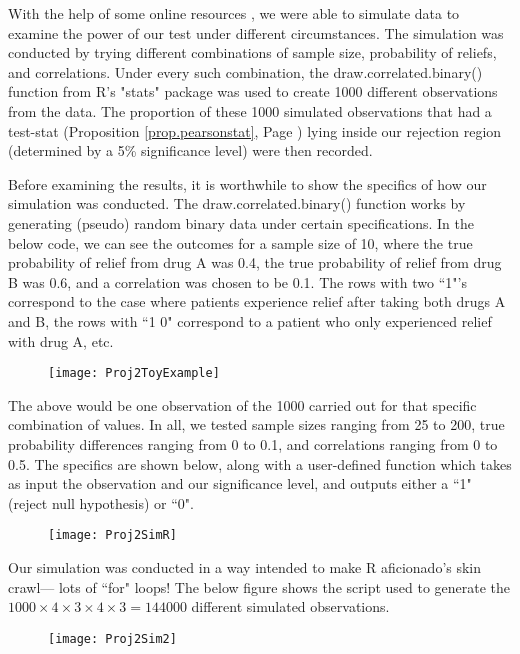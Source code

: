\documentclass[12pt, letterpaper]{article}
\theoremstyle{definition}
\numberwithin{equation}{section}
\newcommand{\myprop}[1]{(Proposition \ref{#1}, Page \pageref{#1})}
\newcommand{\+}[1]{+_{\scalebox{.375}{#1}}}
\newcommand{\1}{\mathbbm{1}}
\begin{document}
With the help of some online resources \cite{draw.correlated}, we were able to simulate data to examine the power of our test under different circumstances. The simulation was conducted by trying different combinations of sample size, probability of reliefs, and correlations. Under every such combination, the draw.correlated.binary() function from R's "stats" package was used to create 1000 different observations from the data. The proportion of these 1000 simulated observations that had a test-stat \myprop{prop.pearsonstat} lying inside our rejection region (determined by a 5\% significance level) were then recorded.
\vspace{\baselineskip}

Before examining the results, it is worthwhile to show the specifics of how our simulation was conducted. The draw.correlated.binary() function works by generating (pseudo) random binary data under certain specifications. In the below code, we can see the outcomes for a sample size of 10, where the true probability of relief from drug A was 0.4, the true probability of relief from drug B was 0.6, and a correlation was chosen to be 0.1. The rows with two ``1"'s correspond to the case where patients experience relief after taking both drugs A and B, the rows with ``1 0" correspond to a patient who only experienced relief with drug A, etc.

\begin{figure}[H]
	\centering
	\texttt{[image: Proj2ToyExample]}
\end{figure}

The above would be one observation of the 1000 carried out for that specific combination of values. In all, we tested sample sizes ranging from 25 to 200, true probability differences ranging from 0 to 0.1, and correlations ranging from 0 to 0.5. The specifics are shown below, along with a user-defined function which takes as input the observation and our significance level, and outputs either a ``1" (reject null hypothesis) or ``0".

\begin{figure}[H]
	\centering
	\texttt{[image: Proj2SimR]}
\end{figure}

Our simulation was conducted in a way intended to make R aficionado's skin crawl--- lots of ``for" loops! The below figure shows the script used to generate the $1000 \times 4 \times 3 \times 4 \times 3=144000$ different simulated observations. 

\begin{figure}[H]
	\centering
	\texttt{[image: Proj2Sim2]}
\end{figure}
\end{document}
